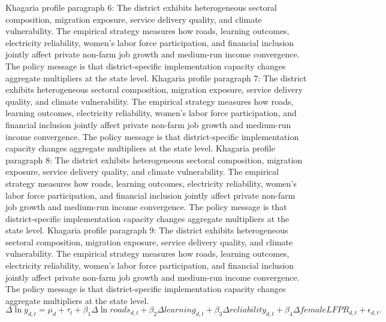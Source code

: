 \documentclass[preprint,12pt]{elsarticle}
\begin{document}
Khagaria profile paragraph 6: The district exhibits heterogeneous sectoral composition, migration exposure, service delivery quality, and climate vulnerability. The empirical strategy measures how roads, learning outcomes, electricity reliability, women's labor force participation, and financial inclusion jointly affect private non-farm job growth and medium-run income convergence. The policy message is that district-specific implementation capacity changes aggregate multipliers at the state level.
Khagaria profile paragraph 7: The district exhibits heterogeneous sectoral composition, migration exposure, service delivery quality, and climate vulnerability. The empirical strategy measures how roads, learning outcomes, electricity reliability, women's labor force participation, and financial inclusion jointly affect private non-farm job growth and medium-run income convergence. The policy message is that district-specific implementation capacity changes aggregate multipliers at the state level.
Khagaria profile paragraph 8: The district exhibits heterogeneous sectoral composition, migration exposure, service delivery quality, and climate vulnerability. The empirical strategy measures how roads, learning outcomes, electricity reliability, women's labor force participation, and financial inclusion jointly affect private non-farm job growth and medium-run income convergence. The policy message is that district-specific implementation capacity changes aggregate multipliers at the state level.
Khagaria profile paragraph 9: The district exhibits heterogeneous sectoral composition, migration exposure, service delivery quality, and climate vulnerability. The empirical strategy measures how roads, learning outcomes, electricity reliability, women's labor force participation, and financial inclusion jointly affect private non-farm job growth and medium-run income convergence. The policy message is that district-specific implementation capacity changes aggregate multipliers at the state level.
\begin{equation}\Delta \ln y_{d,t}=\mu_d+\tau_t+\beta_1\Delta\ln roads_{d,t}+\beta_2\Delta learning_{d,t}+\beta_3\Delta reliability_{d,t}+\beta_4\Delta femaleLFPR_{d,t}+\epsilon_{d,t}.\end{equation}
\end{document}
